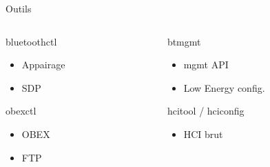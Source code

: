 \begin{frame}
\begin{center}\huge Outils\end{center}
	\begin{columns}[t]
		\begin{column}{0.50\linewidth}
			\begin{block}{bluetoothctl}
				\begin{itemize}
					\item Appairage
					\item SDP
				\end{itemize}
			\end{block}
			\begin{block}{obexctl}
				\begin{itemize}
					\item OBEX
					\item FTP
				\end{itemize}
			\end{block}
		\end{column}
		\begin{column}{0.50\linewidth}
			\begin{block}{btmgmt}
				\begin{itemize}
					\item mgmt API
					\item Low Energy config.
				\end{itemize}
			\end{block}
			\begin{block}{hcitool / hciconfig}
				\begin{itemize}
					\item HCI brut
				\end{itemize}
			\end{block}
		\end{column}
	\end{columns}
\end{frame}

